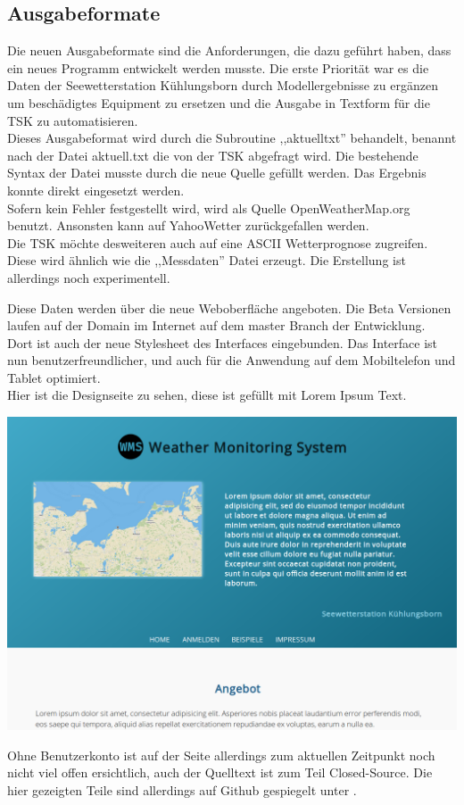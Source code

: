 \subsection{Ausgabeformate}
Die neuen Ausgabeformate sind die Anforderungen, die dazu geführt haben, dass ein neues Programm
entwickelt werden musste. Die erste Priorität war es die Daten der Seewetterstation Kühlungsborn
durch Modellergebnisse zu ergänzen um beschädigtes Equipment zu ersetzen und die Ausgabe in Textform
für die TSK zu automatisieren.\\
Dieses Ausgabeformat wird durch die Subroutine ,,aktuelltxt'' behandelt, benannt nach der Datei aktuell.txt
die von der TSK abgefragt wird. Die bestehende Syntax der Datei musste durch die neue Quelle gefüllt
werden. Das Ergebnis konnte direkt eingesetzt werden.\\

Sofern kein Fehler festgestellt wird, wird als Quelle OpenWeatherMap.org benutzt. Ansonsten kann auf
YahooWetter zurückgefallen werden.\\
Die TSK möchte desweiteren auch auf eine ASCII Wetterprognose zugreifen. Diese wird ähnlich wie die
,,Messdaten'' Datei erzeugt. Die Erstellung ist allerdings noch experimentell.

Diese Daten werden über die neue Weboberfläche angeboten. Die Beta Versionen
laufen auf der Domain  im Internet auf dem master Branch der
Entwicklung.\\
Dort ist auch der neue Stylesheet des Interfaces eingebunden. Das Interface
ist nun benutzerfreundlicher, und auch für die Anwendung auf dem Mobiltelefon und Tablet optimiert.\\
Hier ist die Designseite zu sehen, diese ist gefüllt mit Lorem Ipsum Text.
\begin{center}
    \includegraphics[width=\linewidth]{imgs/wms20.png}
\end{center}
Ohne Benutzerkonto ist auf der Seite allerdings zum aktuellen Zeitpunkt noch
nicht viel offen ersichtlich, auch der Quelltext ist zum Teil Closed-Source.
Die hier gezeigten Teile sind allerdings auf Github gespiegelt unter
.


